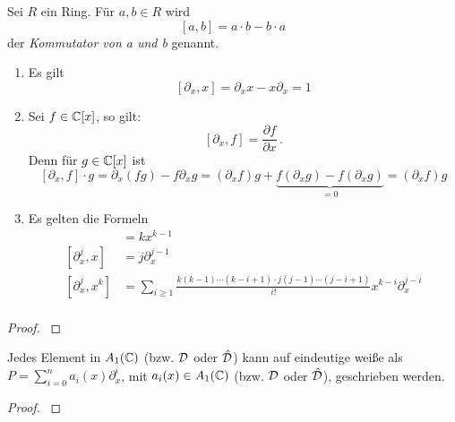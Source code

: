 \begin{defn}[Kommutator]%
  Sei $R$ ein Ring. Für $a,b\in R$ wird
  \[[a,b]=a\cdot b-b\cdot a\]
  der \emph{Kommutator von a und b} genannt.
\end{defn}

\begin{prop} %
  \begin{enumerate}
    \item Es gilt
      \[[ \partial_x,x] = \partial_xx-x\partial_x=1 \]
    \item Sei $f\in \mathbb{C}[x]$, so gilt:
      \[ [\partial_x,f] = \frac{\partial f}{\partial x} \,. \]
      Denn für $g\in \mathbb{C}[x]$ ist
      \[
        [\partial_x,f]\cdot g=\partial_x(fg)-f\partial_xg=
        (\partial_xf)g+\underset{=0}{\underbrace{ 
            f(\partial_xg)-f(\partial_xg)}}=
        (\partial_xf)g
      \]
    \item Es gelten die Formeln\\
    \begin{align*}
      [\partial_x,x^k]   &= kx^{k-1}\\
      [\partial_x^j,x]   &= j\partial_x^{j-1}\\
      [\partial_x^j,x^k] &= \sum_{i\geq1}\frac{k(k-1)\cdots(k-i+1)
        \cdot j(j-1)\cdots(j-i+1)}{i!}x^{k-i}\partial_x^{j-i} \\
    \end{align*}
  \end{enumerate}
\end{prop}
\begin{proof}
  \cite{ZulaBarbara}
\end{proof}

\begin{prop} \label{prop:weyl_eindeutige_schreibung}
  Jedes Element in $A_1(\mathbb{C})$ (bzw. $\mathcal{D}$ oder $\hat{\mathcal{D}}$) kann auf eindeutige
  weiße als $P=\sum_{i=0}^na_i(x)\partial_x^i$, mit $a_i(x)\in A_1(\mathbb{C})$ (bzw.
  $\mathcal{D}$ oder $\hat{\mathcal{D}}$), geschrieben werden. 
\end{prop}
\begin{proof}
  \cite[Proposition 1.2.3]{sabbah_cimpa90}
  \begin{comment}
    ein teil des Beweises ist "left as an exersice"
  \end{comment}
\end{proof}



